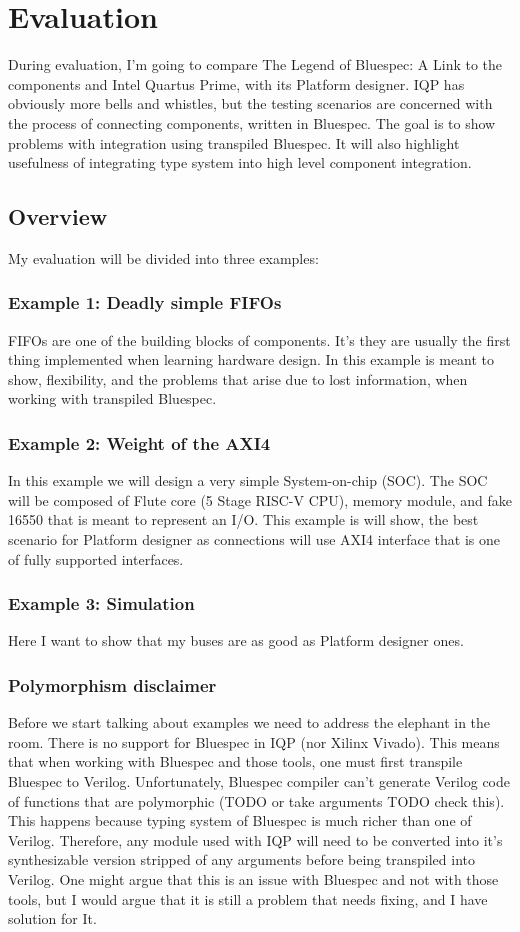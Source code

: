 \documentclass[12pt]{report}
\begin{document}
\chapter{Evaluation}
During evaluation, I'm going to compare The Legend of Bluespec: A Link to the components and Intel Quartus Prime, with its Platform designer. IQP has obviously more bells and whistles, but the testing scenarios are concerned with the process of connecting components, written in Bluespec. The goal is to show problems with integration using transpiled Bluespec. It will also highlight usefulness of integrating type system into high level component integration. 

\section{Overview}
My evaluation will be divided into three examples:
\subsection{Example 1: Deadly simple FIFOs}
FIFOs are one of the building blocks of components. It's they are usually the first thing implemented when learning hardware design. In this example is meant to show, flexibility, and the problems that arise due to lost information, when working with transpiled Bluespec.
\subsection{Example 2: Weight of the AXI4}
In this example we will design a very simple System-on-chip (SOC). The SOC will be composed of Flute core (5 Stage RISC-V CPU), memory module, and fake 16550 that is meant to represent an I/O. This example is will show, the best scenario for Platform designer as connections will use AXI4 interface that is one of fully supported interfaces. 

\subsection{Example 3: Simulation}
Here I want to show that my buses are as good as Platform designer ones.



\subsection{Polymorphism disclaimer}
Before we start talking about examples we need to address the elephant in the room. There is no support for Bluespec in IQP (nor Xilinx Vivado). This means that when working with Bluespec and those tools, one must first transpile Bluespec to Verilog. Unfortunately, Bluespec compiler can't generate Verilog code of functions that are polymorphic (TODO or take arguments TODO check this). This happens because typing system of Bluespec is much richer than one of Verilog. Therefore, any module used with IQP will need to be converted into it's synthesizable version stripped of any arguments before being transpiled into Verilog. One might argue that this is an issue with Bluespec and not with those tools, but I would argue that it is still a problem that needs fixing, and I have solution for It. 
\end{document}
